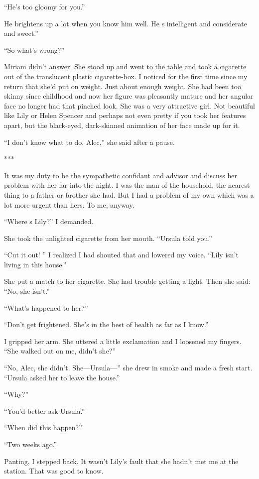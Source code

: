 \documentclass{novel}
\begin{document}
{“He’s too gloomy for you.”

He brightens up a lot when you know him well. He s intelligent and considerate and sweet.”

“So what’s wrong?”

Miriam didn’t answer. She stood up and went to the table and took a cigarette out of the translucent plastic cigarette-box. I noticed for the first time since my return that she’d put on weight. Just about enough weight. She had been too skinny since childhood and now her figure was pleasantly mature and her angular face no longer had that pinched look. She was a very attractive girl. Not beautiful like Lily or Helen Spencer and perhaps not even pretty if you took her features apart, but the black-eyed, dark-skinned animation of her face made up for it.

“I don’t know what to do, Alec,” she said after a pause.

***

It was my duty to be the sympathetic confidant and advisor and discuss her problem with her far into the night. I was the man of the household, the nearest thing to a father or brother she had. But I had a problem of my own which was a lot more urgent than hers. To me, anyway.

“Where s Lily?” I demanded.

She took the unlighted cigarette from her mouth. “Ursula told you.”

“Cut it out! ” I realized I had shouted that and lowered my voice. “Lily isn’t living in this house.”

She put a match to her cigarette. She had trouble getting a light. Then she said: “No, she isn’t.”

“What’s happened to her?”

“Don’t get frightened. She’s in the best of health as far as I know.”

I gripped her arm. She uttered a little exclamation and I loosened my fingers. “She walked out on me, didn’t she?”

“No, Alec, she didn’t. She—Ursula—” she drew in smoke and made a fresh start. “Ursula asked her to leave the house.”

“Why?”

“You’d better ask Ursula.”

“When did this happen?”

“Two weeks ago.”

Panting, I stepped back. It wasn’t Lily’s fault that she hadn’t met me at the station. That was good to know.

}
\end{document}
